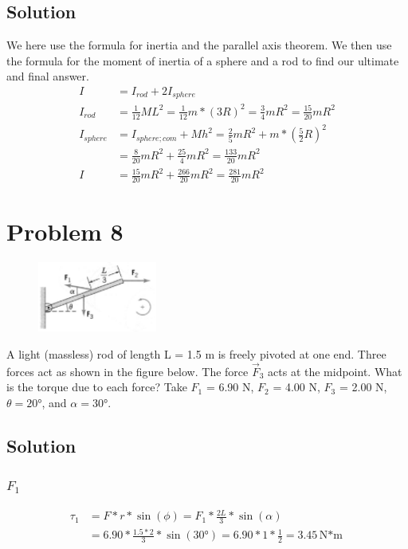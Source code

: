 \documentclass[12pt]{article}
\begin{document}
\subsection*{Solution}
We here use the formula for inertia and the parallel axis theorem. We then use the formula for the moment of inertia of a sphere and a rod to find our ultimate and final answer.
\begin{align*}
    I   &=  I_{rod} + 2I_{sphere}\\
    I_{rod} &=  \frac{1}{12}ML^2
        =   \frac{1}{12}m*(3R)^2
        =   \frac{3}{4}mR^2
        =   \frac{15}{20}mR^2\\
    I_{sphere}  &=  I_{sphere;com} + Mh^2
        =   \frac{2}{5}mR^2 + m*\left(\frac{5}{2}R\right)^2\\
        &=  \frac{8}{20}mR^2 + \frac{25}{4}mR^2
        =   \frac{133}{20}mR^2\\
    I   &=  \frac{15}{20}mR^2 + \frac{266}{20}mR^2
        =   \boxed{\frac{281}{20}mR^2}
\end{align*}


\pagebreak
\section*{Problem 8}
\begin{figure}
    \vspace{-30pt}
    \includegraphics[width=0.35\textwidth]{graph_8.png} 
\end{figure}
A light (massless) rod of length L = 1.5 m is freely pivoted at one end. Three forces act as
shown in the figure below. The force $\vec{F}_3$ acts at the midpoint. What is the torque due to each force?
Take $F_1$ = 6.90 N, $F_2$ = 4.00 N, $F_3$ = 2.00 N, $\theta = 20\unit{\degree}$, and $\alpha = 30\unit{\degree}$.

\subsection*{Solution}
\subsubsection{$F_1$}
\begin{align*}
    \tau_1  &=  F*r*\sin(\phi)
        =   F_1 * \frac{2L}{3} * \sin(\alpha)\\
        &=  6.90 * \frac{1.5*2}{3} * \sin(30\unit{\degree})
        =   6.90 * 1 * \frac{1}{2}
        =   \boxed{3.45 \unit{\newton*\meter}}
\end{align*}
\end{document}
